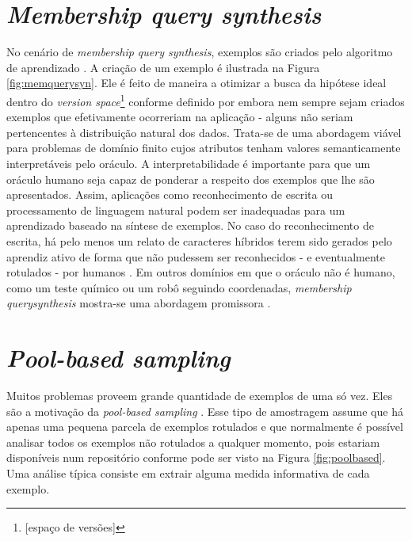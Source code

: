 \section*{\textit{Membership query synthesis}}

No cenário de \textit{membership query synthesis}, exemplos são criados pelo
algoritmo de aprendizado \citep{angluin1988queries}.
A criação de um exemplo é ilustrada na Figura \ref{fig:memquerysyn}.
Ele é feito de maneira a otimizar a busca da hipótese ideal dentro do
\textit{version space}\footnote{[espaço de versões]} conforme definido por
\cite{mitchell1997machine} embora nem
sempre sejam criados exemplos que efetivamente ocorreriam na aplicação - alguns não seriam
pertencentes à distribuição natural dos dados.
Trata-se de uma abordagem viável para problemas de domínio finito cujos atributos tenham valores
semanticamente interpretáveis pelo oráculo.
A interpretabilidade é importante para que um oráculo humano seja capaz de ponderar a respeito
dos
exemplos que lhe são apresentados.
Assim, aplicações como reconhecimento de escrita ou processamento de linguagem natural podem ser
inadequadas para um aprendizado baseado na síntese de exemplos.
No caso do reconhecimento de escrita, há pelo menos um relato de caracteres híbridos terem sido
gerados pelo aprendiz ativo de forma que não pudessem ser reconhecidos - e eventualmente
rotulados
- por humanos \citep{settles2010active,baum1992query}. Em outros domínios em que o oráculo não é
humano, como um teste químico ou um robô seguindo coordenadas, \textit{membership querysynthesis}
mostra-se uma abordagem promissora \citep{cohn1996active}.


\section*{\textit{Pool-based sampling}}
Muitos problemas proveem grande quantidade de exemplos de uma só vez. Eles são a motivação da
\textit{pool-based sampling} \citep{lewis1994heterogeneous}.
Esse tipo de amostragem assume que há apenas uma pequena parcela de exemplos rotulados e que
normalmente é possível analisar todos os exemplos não rotulados a qualquer momento, pois estariam
disponíveis num repositório conforme pode ser visto na Figura \ref{fig:poolbased}.
Uma análise típica consiste em extrair alguma medida informativa de cada exemplo.


